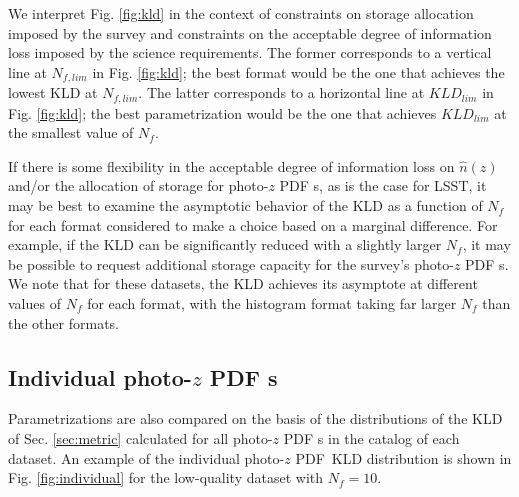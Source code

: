 \documentclass[\docopts]{\docclass}
\newcommand{\pz}{photo-$z$ PDF\xspace}
\begin{document}
We interpret Fig. \ref{fig:kld} in the context of constraints on storage 
allocation imposed by the survey and constraints on the acceptable degree of 
information loss imposed by the science requirements.  The former corresponds 
to a vertical line at $N_{f, lim}$ in Fig. \ref{fig:kld}; the best format would 
be the one that achieves the lowest KLD at $N_{f, lim}$.  The latter 
corresponds to a horizontal line at $KLD_{lim}$ in Fig. \ref{fig:kld}; the best 
parametrization would be the one that achieves $KLD_{lim}$ at the smallest 
value of $N_{f}$.

If there is some flexibility in the acceptable degree of information loss on 
$\hat{n}(z)$ and/or the allocation of storage for \pz s, as is the case for 
LSST, it may be best to examine the asymptotic behavior of the KLD as a 
function of $N_{f}$ for each format considered to make a choice based on a 
marginal difference.  For example, if the KLD can be significantly reduced with 
a slightly larger $N_{f}$, it may be possible to request additional storage 
capacity for the survey's \pz s.  We note that for these datasets, the KLD 
achieves its asymptote at different values of $N_{f}$ for each format, with the 
histogram format taking far larger $N_{f}$ than the other formats.

\subsection{Individual \pz s}
\label{sec:individual_results}

Parametrizations are also compared on the basis of the distributions of the KLD 
of Sec. \ref{sec:metric} calculated for all \pz s in the catalog of each 
dataset.  An example of the individual \pz\ KLD distribution is shown in Fig. 
\ref{fig:individual} for the low-quality dataset with $N_{f}=10$.
\end{document}
